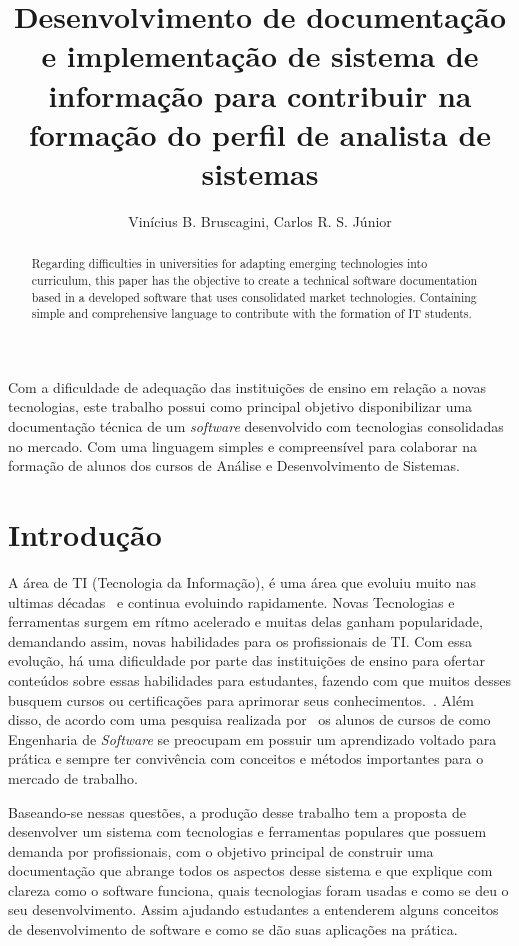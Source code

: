 \documentclass[12pt]{article}
\title{
    Desenvolvimento de documentação e implementação de sistema de informação para
    contribuir na formação do perfil de analista de sistemas
}
\author{Vinícius B. Bruscagini\inst{1}, Carlos R. S. Júnior\inst{1}}
\begin{document}
\maketitle

\begin{abstract}
  Regarding difficulties in universities for adapting emerging technologies into curriculum, this paper
  has the objective to create a technical software documentation based in a developed software that
  uses consolidated market technologies. Containing simple and comprehensive language to contribute
  with the formation of IT students.
\end{abstract}

\begin{resumo}
  Com a dificuldade de adequação das instituições de ensino em relação a novas tecnologias, este trabalho possui como principal objetivo
  disponibilizar uma documentação técnica de um \textit{software} desenvolvido com tecnologias
  consolidadas no mercado. Com uma linguagem simples e compreensível para colaborar na formação
  de alunos dos cursos de Análise e Desenvolvimento de Sistemas.
\end{resumo}

\section{Introdução}

A área de TI (Tecnologia da Informação), é uma área que evoluiu muito nas ultimas
décadas~\cite{Pacheco10} e continua evoluindo rapidamente. Novas Tecnologias e ferramentas
surgem em rítmo acelerado e muitas delas ganham popularidade, demandando assim, novas
habilidades para os profissionais de TI\@. Com essa evolução, há uma dificuldade por parte das
instituições de ensino para ofertar conteúdos sobre essas habilidades para estudantes, fazendo com que
muitos desses busquem cursos ou certificações para aprimorar seus conhecimentos.~\cite{macedo09}.
Além disso, de acordo com uma pesquisa realizada por~\cite{wei08} os alunos de cursos de como Engenharia de \textit{Software}
se preocupam em possuir um aprendizado voltado para prática e sempre ter convivência com conceitos
e métodos importantes para o mercado de trabalho.

Baseando-se nessas questões, a produção desse trabalho tem a proposta de desenvolver
um sistema com tecnologias e ferramentas populares que possuem demanda por profissionais,
com o objetivo principal de construir uma documentação
que abrange todos os aspectos desse sistema e que explique com clareza como o software
funciona, quais tecnologias foram usadas e como se deu o seu desenvolvimento. Assim ajudando estudantes a
entenderem alguns conceitos de desenvolvimento de software e como se dão suas aplicações na prática.
\end{document}
